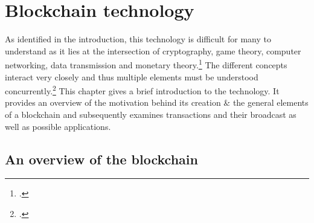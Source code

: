 \chapter{Blockchain technology} \label{chap:Blockchain}

As identified in the introduction, this technology is difficult for many to understand as it lies at the intersection of cryptography, game theory, computer networking, data transmission and monetary theory.\footcite[Cf.][]{LoppNobodyUnderstandsBitcoin2017} The different concepts interact very closely and thus multiple elements must be understood concurrently.\footcite[Cf.][p.2]{SwellerVisualisationInstructionalDesign2002} This chapter gives a  brief introduction to the technology. It provides an overview of the motivation behind its creation \& the general elements of a blockchain and subsequently examines transactions and their broadcast as well as possible applications. 

\section{An overview of the blockchain} \label{sec:Blockchain}

